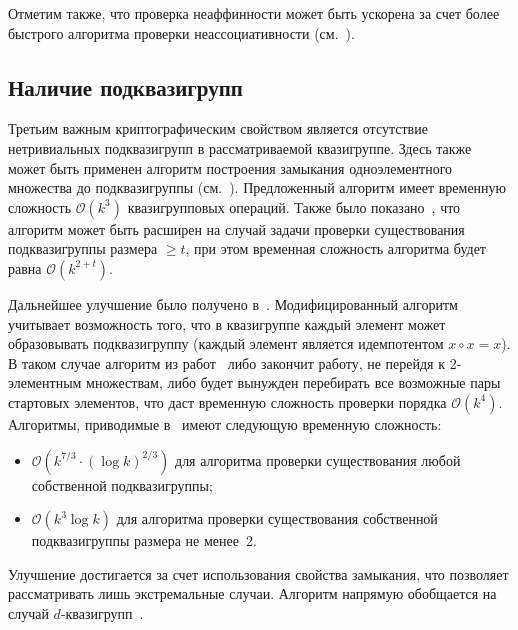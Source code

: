     Отметим также, что проверка неаффинности может быть ускорена за счет более быстрого алгоритма проверки неассоциативности (см.~\cite{rajagopalan2000verification, evra2024verifying}).



\subsection{Наличие подквазигрупп}
\label{sec:subquasi}
    Третьим важным криптографическим свойством является отсутствие нетривиальных подквазигрупп в рассматриваемой квазигруппе.
    Здесь также может быть применен  алгоритм построения замыкания одноэлементного множества до подквазигруппы (см.~\cite{toropov18, sobyanin19}). 
    Предложенный алгоритм имеет временную сложность $\mathcal{O}(k^3)$ квазигрупповых операций.
    Также было показано~\cite{galatenko2022algorithms}, что алгоритм может быть расширен на случай задачи проверки существования подквазигруппы размера $\ge t$, при этом временная сложность алгоритма будет равна $\mathcal{O}(k^{2+t})$.

    Дальнейшее улучшение было получено в~\cite{galatenko21subquasi}. 
    Модифицированный алгоритм учитывает возможность того, что в квазигруппе каждый элемент может образовывать подквазигруппу (каждый элемент является идемпотентом $x \circ x = x$).
    В таком случае алгоритм из работ~\cite{toropov18, sobyanin19} либо закончит работу, не перейдя к 2-элементным множествам, либо будет вынужден перебирать все возможные пары стартовых элементов, что даст временную сложность проверки порядка $\mathcal{O}(k^4)$.
    Алгоритмы, приводимые в~\cite{galatenko21subquasi} имеют следующую временную сложность:
    \begin{itemize}
        \item $\mathcal{O}(k^{7/3} \cdot \left( \log k \right)^{2/3})$ для алгоритма проверки существования любой собственной подквазигруппы;
        \item $\mathcal{O}(k^3 \log k)$ для алгоритма проверки существования собственной подквазигруппы размера не менее~2.
    \end{itemize}
    Улучшение достигается за счет использования свойства  замыкания, что позволяет рассматривать лишь экстремальные случаи.
    Алгоритм напрямую обобщается на случай $d$-квазигрупп~\cite{galatenko21nsubquasi}.

